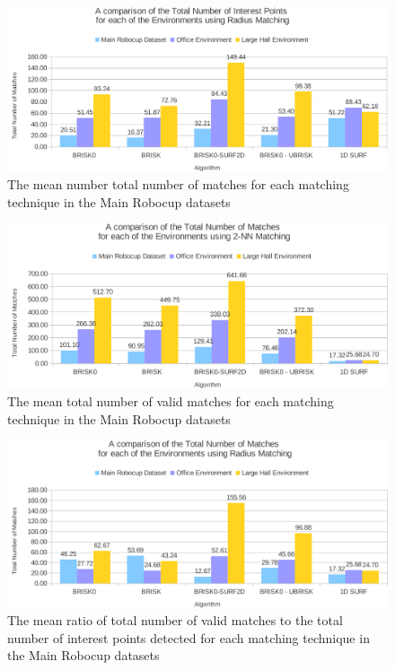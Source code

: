 \begin{figure}
  \centering
    \includegraphics[width=1.0\textwidth]{../Drawings/Graphs/overall_tn_ip_radius.pdf}
    \caption{The mean number total number of matches for each matching technique in the Main Robocup datasets} 
    \label{fig:overall_tn_ip_radius}
\end{figure}

\begin{figure}
  \centering
    \includegraphics[width=1.0\textwidth]{../Drawings/Graphs/overall_tnm.pdf}
    \caption{The mean total number of valid matches for each matching technique in the Main Robocup datasets} 
    \label{fig:overall_tnm}
\end{figure}

\begin{figure}
  \centering
    \includegraphics[width=1.0\textwidth]{../Drawings/Graphs/overall_tnm_radius.pdf}
    \caption{The mean ratio of total number of valid matches to the total number of interest points detected for each matching technique in the Main Robocup datasets} 
    \label{fig:overall_tnm_radius}
\end{figure}

